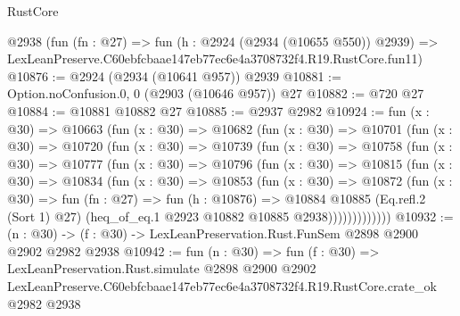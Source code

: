 \begin{lexlean}{RustCore}
\begin{coremodule}
    @2938
    (fun (fn : @27) =>
    fun (h : @2924 (@2934 (@10655 @550)) @2939) =>
    LexLeanPreserve.C60ebfcbaae147eb77ec6e4a3708732f4.R19.RustCore.fun11)
@10876 := @2924 (@2934 (@10641 @957)) @2939
@10881 := Option.noConfusion.{0, 0} (@2903 (@10646 @957)) @27
@10882 := @720 @27
@10884 := @10881 @10882 @27
@10885 := @2937 @2982
@10924 := fun (x : @30) =>
  @10663
    (fun (x : @30) =>
    @10682
      (fun (x : @30) =>
      @10701
        (fun (x : @30) =>
        @10720
          (fun (x : @30) =>
          @10739
            (fun (x : @30) =>
            @10758
              (fun (x : @30) =>
              @10777
                (fun (x : @30) =>
                @10796
                  (fun (x : @30) =>
                  @10815
                    (fun (x : @30) =>
                    @10834
                      (fun (x : @30) =>
                      @10853
                        (fun (x : @30) =>
                        @10872
                          (fun (x : @30) =>
                          fun (fn : @27) =>
                          fun (h : @10876) =>
                          @10884
                            @10885
                            (Eq.refl.{2} (Sort 1) @27)
                            (heq_of_eq.{1} @2923 @10882 @10885 @2938)))))))))))))
@10932 := (n : @30) -> (f : @30) -> LexLeanPreservation.Rust.FunSem @2898 @2900 @2902 @2982 @2938
@10942 := fun (n : @30) =>
  fun (f : @30) =>
  LexLeanPreservation.Rust.simulate
    @2898
    @2900
    @2902
    LexLeanPreserve.C60ebfcbaae147eb77ec6e4a3708732f4.R19.RustCore.crate_ok
    @2982
    @2938
\end{coremodule}
\end{lexlean}
